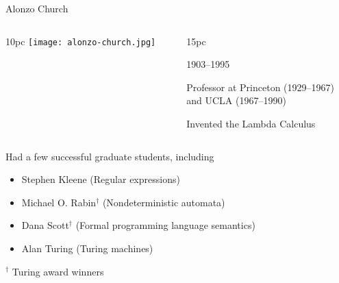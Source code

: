 \documentclass[handout]{plt}
\begin{document}
\begin{frame}[t]{Alonzo Church}

\vskip 1pc

  \begin{columns}
    \begin{column}{10pc}
      \texttt{[image: alonzo-church.jpg]}
    \end{column}
    \begin{column}{15pc}

1903--1995

Professor at Princeton (1929--1967) \\
and UCLA (1967--1990)

Invented the Lambda Calculus

    \end{column}
  \end{columns}

Had a few successful graduate students, including

\begin{itemize}
\item Stephen Kleene (Regular expressions)
\item Michael O. Rabin$^{\dagger}$ (Nondeterministic automata)
\item Dana Scott$^{\dagger}$ (Formal programming language semantics)
\item Alan Turing (Turing machines)
\end{itemize}

$^{\dagger}$ Turing award winners


\end{frame}
\end{document}

